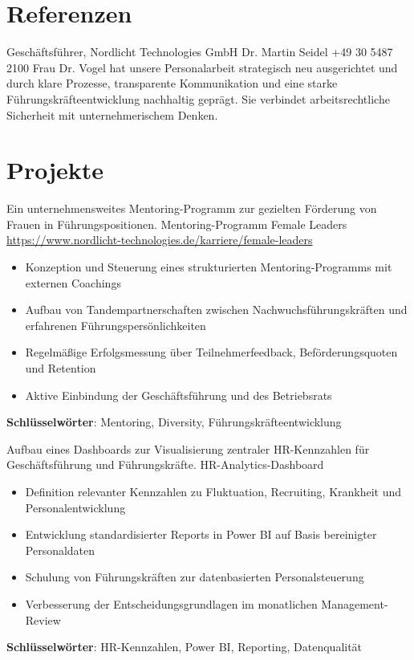 \documentclass[a4paper, serif, 10pt]{moderncv}
\begin{document}
\section{Referenzen}

        {Geschäftsführer, Nordlicht Technologies GmbH}
        {Dr. Martin Seidel}
        {+49 30 5487 2100}
        {}
        {Frau Dr. Vogel hat unsere Personalarbeit strategisch neu ausgerichtet und durch klare Prozesse, transparente Kommunikation und eine starke Führungskräfteentwicklung nachhaltig geprägt. Sie verbindet arbeitsrechtliche Sicherheit mit unternehmerischem Denken.}
\section{Projekte}

        {Ein unternehmensweites Mentoring-Programm zur gezielten Förderung von Frauen in Führungspositionen.}
        {Mentoring-Programm Female Leaders}
        {\url{https://www.nordlicht-technologies.de/karriere/female-leaders}}
        {}
        {\begin{itemize}
\item Konzeption und Steuerung eines strukturierten Mentoring-Programms mit externen Coachings
\item Aufbau von Tandempartnerschaften zwischen Nachwuchsführungskräften und erfahrenen Führungspersönlichkeiten
\item Regelmäßige Erfolgsmessung über Teilnehmerfeedback, Beförderungsquoten und Retention
\item Aktive Einbindung der Geschäftsführung und des Betriebsrats
\end{itemize}
\textbf{Schlüsselwörter}: Mentoring, Diversity, Führungskräfteentwicklung}

        {Aufbau eines Dashboards zur Visualisierung zentraler HR-Kennzahlen für Geschäftsführung und Führungskräfte.}
        {HR-Analytics-Dashboard}
        {}
        {}
        {\begin{itemize}
\item Definition relevanter Kennzahlen zu Fluktuation, Recruiting, Krankheit und Personalentwicklung
\item Entwicklung standardisierter Reports in Power BI auf Basis bereinigter Personaldaten
\item Schulung von Führungskräften zur datenbasierten Personalsteuerung
\item Verbesserung der Entscheidungsgrundlagen im monatlichen Management-Review
\end{itemize}
\textbf{Schlüsselwörter}: HR-Kennzahlen, Power BI, Reporting, Datenqualität}
\end{document}

